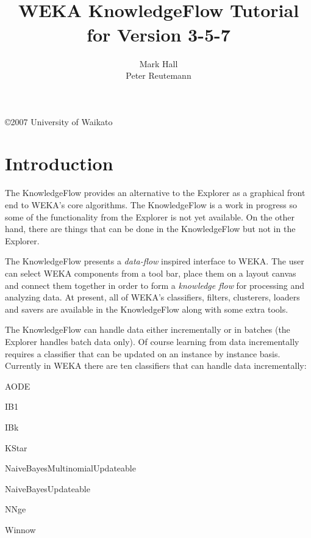 \documentclass[a4paper]{article}
\title{\epsfig{file=images/coat_of_arms.eps,width=10cm}\vspace{3cm}\\WEKA KnowledgeFlow Tutorial\\for Version 3-5-7}
\author{Mark Hall\\Peter Reutemann}
\newenvironment{tight_itemize}{
\begin{itemize}
  \setlength{\itemsep}{1pt}
  \setlength{\parskip}{0pt}
  \setlength{\parsep}{0pt}}{\end{itemize}
}
\begin{document}
\begin{titlepage}

\maketitle
\thispagestyle{empty}

\center
\vspace{8cm}

\copyright 2007 University of Waikato

\end{titlepage}

\tableofcontents


\newpage
\section{Introduction}

The KnowledgeFlow provides an alternative to the Explorer as a
graphical front end to WEKA's core algorithms. The KnowledgeFlow is a
work in progress so some of the functionality from the Explorer is not
yet available. On the other hand, there are things that can be done in
the KnowledgeFlow but not in the Explorer.

\begin{center}
\end{center}

The KnowledgeFlow presents a \textit{data-flow} inspired interface to
WEKA. The user can select WEKA components from a tool bar, place them
on a layout canvas and connect them together in order to form a
\textit{knowledge flow} for processing and analyzing data. At present, all of
WEKA's classifiers, filters, clusterers, loaders and savers are
available in the KnowledgeFlow along with some extra tools.

The KnowledgeFlow can handle data either incrementally or in batches
(the Explorer handles batch data only). Of course learning from data
incrementally requires a classifier that can be updated on an instance
by instance basis. Currently in WEKA there are ten classifiers that
can handle data incrementally:
\begin{tight_itemize}
	\item AODE
	\item IB1
	\item IBk
	\item KStar
	\item NaiveBayesMultinomialUpdateable
	\item NaiveBayesUpdateable
	\item NNge
	\item Winnow
\end{tight_itemize}
\end{document}
